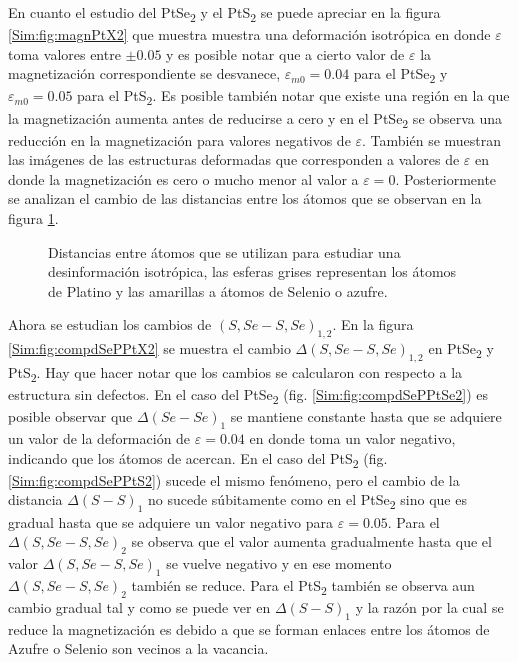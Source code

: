 En cuanto el estudio del PtSe\textsubscript{2} y el PtS\textsubscript{2} se puede apreciar en la figura \ref{Sim:fig:magnPtX2} que muestra muestra una deformaci\'on isotr\'opica en donde $\varepsilon$ toma valores entre $\pm 0.05$ y es posible notar que a cierto valor de $\varepsilon$ la magnetizaci\'on correspondiente se desvanece, $\varepsilon_{m0}=0.04$ para el PtSe\textsubscript{2} y $\varepsilon_{m0}=0.05$ para el  PtS\textsubscript{2}. Es posible tambi\'en notar que existe una regi\'on en la que la magnetizaci\'on aumenta antes de reducirse a cero y en el PtSe\textsubscript{2} se observa una reducci\'on en la
magnetizaci\'on para valores negativos de $\varepsilon$. Tambi\'en se muestran las im\'agenes de las estructuras deformadas que corresponden a valores de $\varepsilon$ en donde la magnetizaci\'on es cero o mucho menor al valor a $\varepsilon=0$. Posteriormente se analizan el cambio de las distancias entre los \'atomos que se observan en la figura \ref{Sim:fig:defIsoPtX2}.
\begin{figure}[htbp]
	\centering
	\caption[Estudio de distancias en sistemas con Platino y una vacancia bajo una deformaci\'on isotr\'opica]{Distancias entre \'atomos que se utilizan para estudiar una desinformación isotrópica, las esferas grises representan los \'atomos de Platino y las amarillas a \'atomos de Selenio o  azufre. }
	\label{Sim:fig:defIsoPtX2}
\end{figure}
\par Ahora se estudian los  cambios de $(S,Se-S,Se)_{1,2}$. En la figura \ref{Sim:fig:compdSePPtX2} se muestra el cambio $\Delta (S,Se-S,Se)_{1,2}$ en PtSe\textsubscript{2} y PtS\textsubscript{2}. Hay que hacer notar que los cambios se calcularon con respecto a la estructura sin defectos.  En el caso del PtSe\textsubscript{2} (fig. \ref{Sim:fig:compdSePPtSe2}) es posible observar que $\Delta (Se-Se)_{1}$ se mantiene constante hasta que se adquiere un valor de la deformaci\'on de $\varepsilon=0.04$ en donde toma un valor negativo, indicando que los \'atomos de acercan. En el caso del PtS\textsubscript{2} (fig. \ref{Sim:fig:compdSePPtS2}) sucede el mismo fen\'omeno, pero el cambio de  la distancia $\Delta (S-S)_{1}$ no sucede súbitamente como en el PtSe\textsubscript{2} sino que es gradual hasta que se adquiere un valor negativo para $\varepsilon=0.05$. Para  el   $\Delta (S,Se-S,Se)_{2}$  se observa que el valor aumenta gradualmente hasta que el valor  $\Delta (S,Se-S,Se)_{1}$ se vuelve negativo y en ese momento $\Delta (S,Se-S,Se)_{2}$ tambi\'en se reduce. Para el  PtS\textsubscript{2} tambi\'en se observa aun cambio gradual tal y como se puede ver  en $\Delta (S-S)_{1}$ y la raz\'on por la cual  se reduce la magnetización es debido a que se   forman enlaces entre los \'atomos de Azufre  o Selenio son vecinos a la vacancia.
